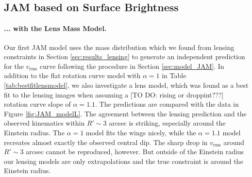 \subsection{JAM based on Surface Brightness} \label{sec:results_JAM_SB}

\paragraph{... with the Lens Mass Model.} Our first JAM model uses the mass distribution which we found from lensing constraints in Section \ref{sec:results_lensing} to generate an independent prediction for the $v_\text{rms}$ curve following the procedure in Section \ref{sec:model_JAM}. In addition to the flat rotation curve model with $\alpha = 1$ in Table \ref{tab:bestfitlensmodel}, we also investigate a lens model, which was found as a best fit to the lensing images when assuming a [TO DO: rising or droppint???] rotation curve slope of $\alpha=1.1$. The predictions are compared with the data in Figure \ref{fig:JAM_modelL}. The agreement between the lensing prediction and the observed kinematics within $R' \sim 3$ arcsec is striking, especially around the Einstein radius. The $\alpha = 1$ model fits the wings nicely, while the $\alpha = 1.1$ model recreates almost exactly the observed central dip. The sharp drop in $v_\text{rms}$ around $R' \sim 3$ arcsec cannot be reproduced, however. But outside of the Einstein radius our lensing models are only extrapolations and the true constraint is around the Einstein radius.


